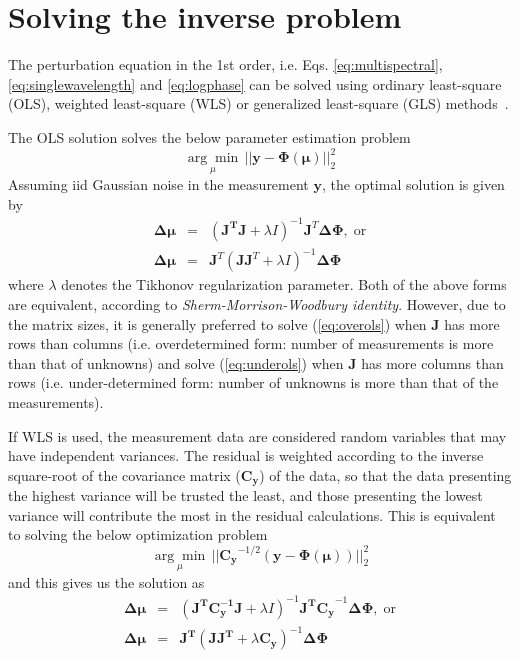 \documentclass[12pt]{book}               %
\begin{document}
\section{Solving the inverse problem}
The perturbation equation in the 1st order, i.e. Eqs. \ref{eq:multispectral}, \ref{eq:singlewavelength} and \ref{eq:logphase} can be solved using ordinary least-square (OLS), weighted least-square (WLS) or generalized least-square (GLS) methods~\cite{FangThesis}.

The OLS solution solves the below parameter estimation problem
\begin{equation}
\underset{\mu}{\arg\min} \, || \mathbf{y-\Phi(\mu)} ||^2_2
\end{equation}
Assuming iid Gaussian noise in the measurement $\mathbf y$, the optimal solution is given by
\begin{eqnarray}
\mathbf{\Delta\mu}&=&(\mathbf{J^TJ}+\lambda I)^{-1}\mathbf{J}^T\mathbf{\Delta\Phi},\;\mathrm{or}\label{eq:overols}\\
\mathbf{\Delta\mu}&=&\mathbf{J}^T(\mathbf{JJ}^T+\lambda I)^{-1}\mathbf{\Delta\Phi}\label{eq:underols}
\end{eqnarray}
where $\lambda$ denotes the Tikhonov regularization parameter. Both of the above forms are equivalent, according to \emph{Sherm-Morrison-Woodbury
identity}. However, due to the matrix sizes, it is generally preferred to solve (\ref{eq:overols}) when $\mathbf{J}$ has more rows than columns (i.e. overdetermined form: number of measurements is more than that of unknowns) and solve (\ref{eq:underols}) when $\mathbf{J}$ has more columns than rows (i.e. under-determined form: number of unknowns is more than that of the measurements).

If WLS is used, the measurement data are considered random variables that may have independent variances. The residual is weighted according to the inverse square-root of the covariance matrix ($\mathbf{C_y}$) of the data, so that the data presenting the highest variance will be trusted the least, and those presenting the lowest variance will contribute the most in the residual calculations. This is equivalent to solving the below optimization problem
\begin{equation}
\underset{\mu}{\arg\min} \, || \mathbf{C_y}^{-1/2}\left(\boldsymbol{y-\Phi(\mu)}\right) ||^2_2
\end{equation}
and this gives us the solution as
\begin{eqnarray}
\mathbf{\Delta\mu}&=&(\mathbf{J^TC_y^{-1}J}+\lambda I)^{-1}\mathbf{J^TC_y}^{-1}\mathbf{\Delta\Phi},\;\mathrm{or}\label{eq:overwls}\\
\mathbf{\Delta\mu}&=&\mathbf{J^T}(\mathbf{JJ^T}+\lambda \mathbf{C_y})^{-1}\mathbf{\Delta\Phi}\label{eq:underwls}
\end{eqnarray}
\end{document}
